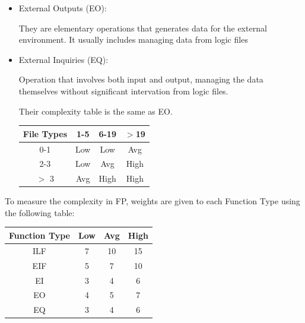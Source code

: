 \documentclass[a4paper]{article}
\begin{document}
\begin{itemize}
\newpage
\item External Outputs (EO): \par
They are elementary operations that generates data for the external environment. It usually includes managing data from logic files
\item External Inquiries (EQ): \par
Operation that involves both input and output, managing the data themselves without significant intervation from logic files.\par
Their complexity table is the same as EO.
\begin{center}
\begin{tabular}{ | c | c | c | c | }
\hline
	\textbf{File Types} & \textbf{1-5} & \textbf{6-19} & \textbf{\(>\)19} \\ \hline\hline
	0-1 & Low & Low & Avg  \\ \hline
	2-3 & Low & Avg & High  \\ \hline
	\(>\) 3 & Avg & High & High  \\ \hline
\end{tabular}
\end{center}
\end{itemize}
To measure the complexity in FP, weights are given to each Function Type using the following table:
\begin{center}
\begin{tabular}{ | c | c | c | c | }
\hline
	\textbf{Function Type} & \textbf{Low} & \textbf{Avg} & \textbf{High} \\ \hline\hline
	ILF & 7 & 10 & 15  \\ \hline
	EIF & 5 & 7 & 10  \\ \hline
	EI & 3 & 4 & 6  \\ \hline
	EO & 4 & 5 & 7  \\ \hline
	EQ & 3 & 4 & 6  \\ \hline
\end{tabular}
\end{center}
\end{document}
